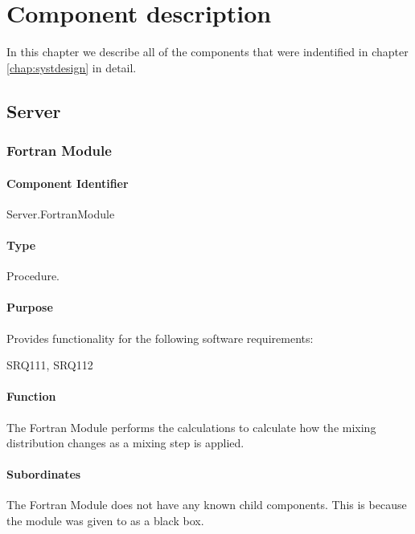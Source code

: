 \chapter{Component description}
\label{chap:compdescr}
In this chapter we describe all of the components that were indentified in chapter \ref{chap:systdesign} in detail. 

\section{Server}
\subsection{Fortran Module}
\label{subsec:fortranmodule}

\subsubsection*{Component Identifier}
Server.FortranModule

\subsubsection*{Type}
Procedure.

\subsubsection*{Purpose}
Provides functionality for the following software requirements:

\noindent SRQ111, SRQ112

\subsubsection*{Function}
The Fortran Module performs the calculations to calculate how the mixing distribution changes as a mixing step is applied.

\subsubsection*{Subordinates}
The Fortran Module does not have any known child components. This is because the module was given to \projectauthor{} as a black box.

